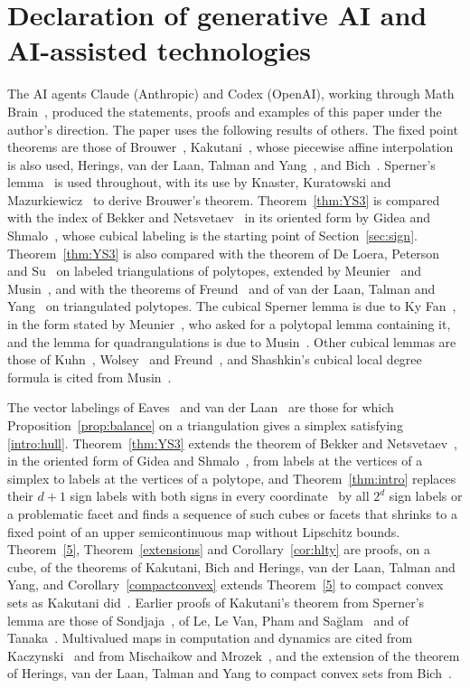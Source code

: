 \documentclass[11pt]{amsart}
\theoremstyle{definition}
\theoremstyle{remark}
\numberwithin{equation}{section}
\begin{document}
\section*{Declaration of generative AI and AI-assisted technologies}
The AI agents Claude (Anthropic) and Codex (OpenAI), working through Math Brain~\cite{MathBrainRepo}, produced the statements, proofs and examples of this paper under the author's direction. The paper uses the following results of others. The fixed point theorems are those of Brouwer~\cite{Brou11}, Kakutani~\cite{KF}, whose piecewise affine interpolation is also used, Herings, van der Laan, Talman and Yang~\cite{HLTY}, and Bich~\cite{Bich06}. Sperner's lemma~\cite{Sperner1928} is used throughout, with its use by Knaster, Kuratowski and Mazurkiewicz~\cite{KKM29} to derive Brouwer's theorem. Theorem~\ref{thm:YS3} is compared with the index of Bekker and Netsvetaev~\cite{Bekker1995} in its oriented form by Gidea and Shmalo~\cite{GS1}, whose cubical labeling is the starting point of Section~\ref{sec:sign}. Theorem~\ref{thm:YS3} is also compared with the theorem of De Loera, Peterson and Su~\cite{DLPS02} on labeled triangulations of polytopes, extended by Meunier~\cite{Meu06} and Musin~\cite{Musin15}, and with the theorems of Freund~\cite{Fre89} and of van der Laan, Talman and Yang~\cite{LTY01} on triangulated polytopes. The cubical Sperner lemma is due to Ky Fan~\cite{Fan60}, in the form stated by Meunier~\cite{Meu08}, who asked for a polytopal lemma containing it, and the lemma for quadrangulations is due to Musin~\cite{MusinQ}. Other cubical lemmas are those of Kuhn~\cite{Kuhn60}, Wolsey~\cite{Wol77} and Freund~\cite{Fre84}, and Shashkin's cubical local degree formula is cited from Musin~\cite{MusinQ}.

The vector labelings of Eaves~\cite{Eaves} and van der Laan~\cite{Laa80} are those for which Proposition~\ref{prop:balance} on a triangulation gives a simplex satisfying \eqref{intro:hull}. Theorem~\ref{thm:YS3} extends the theorem of Bekker and Netsvetaev~\cite{Bekker1995}, in the oriented form of Gidea and Shmalo~\cite[Theorem~2.6]{GS1}, from labels at the vertices of a simplex to labels at the vertices of a polytope, and Theorem~\ref{thm:intro} replaces their $d+1$ sign labels with both signs in every coordinate~\cite[Theorem~3.4]{GS1} by all $2^d$ sign labels or a problematic facet and finds a sequence of such cubes or facets that shrinks to a fixed point of an upper semicontinuous map without Lipschitz bounds. Theorem~\ref{5}, Theorem~\ref{extensions} and Corollary~\ref{cor:hlty} are proofs, on a cube, of the theorems of Kakutani, Bich and Herings, van der Laan, Talman and Yang, and Corollary~\ref{compactconvex} extends Theorem~\ref{5} to compact convex sets as Kakutani did~\cite{KF}. Earlier proofs of Kakutani's theorem from Sperner's lemma are those of Sondjaja~\cite{LM}, of Le, Le Van, Pham and Sa\u{g}lam~\cite{Le} and of Tanaka~\cite{YT}. Multivalued maps in computation and dynamics are cited from Kaczynski~\cite{Kaczynski2008} and from Mischaikow and Mrozek~\cite{MM}, and the extension of the theorem of Herings, van der Laan, Talman and Yang to compact convex sets from Bich~\cite{lmk}.
\end{document}
